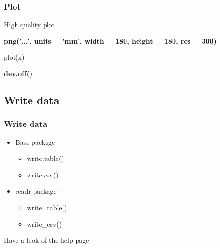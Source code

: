 \documentclass{beamer}
\begin{document}
\begin{frame}[fragile]
	\frametitle{Plot}
	\centering \Large High quality plot
	\vspace{30pt}
	\normalsize
	\begin{flushleft}
		\textbf{png('\ldots', units = 'mm', width = 180, height = 180, res = 300)}

	plot(x)

	\textbf{dev.off()}
	\end{flushleft}
\end{frame}


\subsection{Write data}
\begin{frame}[fragile]
	\frametitle{Write data}
	\centering \Large
	\begin{itemize}
		\small
		\item Base package
			\begin{itemize}
				\item write.table()
				\item write.csv()
			\end{itemize}
		\item readr package
			\begin{itemize}
				\item write\_table()
				\item write\_csv()
			\end{itemize}
	\end{itemize}
	\vspace{20pt}
	\pause
	\begin{center} \Large Have a look of the help page \end{center}
\end{frame}
\end{document}
